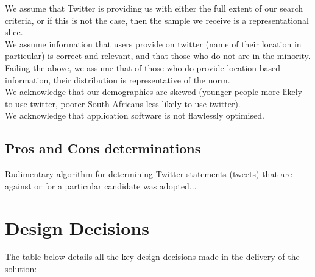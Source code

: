 \documentclass[12pt]{article} %
\begin{document}
		We assume that Twitter is providing us with either the full extent of our search criteria, or if this is not the case, then the sample we receive is a representational slice.\\
		We assume information that users provide on twitter (name of their location in particular) is correct and relevant, and that those who do not are in the minority.\\
		Failing the above, we assume that of those who do provide location based information, their distribution is representative of the norm.\\
		We acknowledge that our demographics are skewed (younger people more likely to use twitter, poorer South Africans less likely to use twitter).\\
		We acknowledge that application software is not flawlessly optimised.
		
	
		\subsection{Pros and Cons determinations}
		Rudimentary algorithm for determining Twitter statements (tweets) that are against or for a particular candidate was adopted... 
	\section {Design Decisions}
	
	The table below details all the key design decisions made in the delivery of the solution:
	
\end{document}
